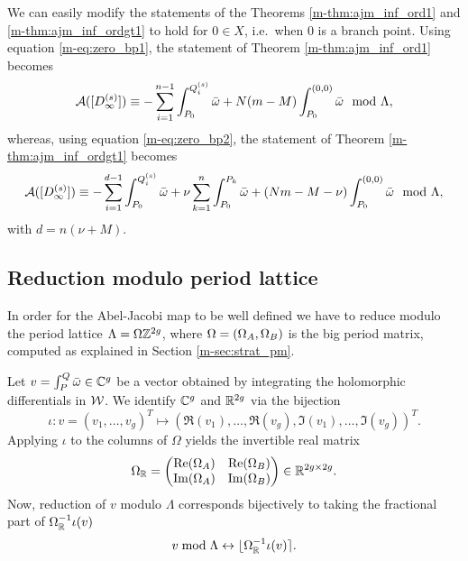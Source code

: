 \documentclass[main.tex]{subfiles}
\begin{document}
    \begin{rmk}\label{rmk:zero_bp}
     We can easily modify the statements of the Theorems \ref{m-thm:ajm_inf_ord1} and \ref{m-thm:ajm_inf_ordgt1} to hold for
     $0 \in X$, i.e.\ when $0$ is a branch point.
     Using equation \eqref{m-eq:zero_bp1}, the statement of Theorem \ref{m-thm:ajm_inf_ord1} becomes
      \begin{equation*}
       \mathcal{A}( [D_{\infty}^{(s)}] ) \equiv -\sum_{i = 1}^{n-1} \int_{P_0}^{Q_i^{(s)}} \bar{\omega} + N(m-M) \int_{P_0}^{(0,0)} \bar{\omega} \mod \Lambda,
    \end{equation*}
    whereas, using equation \eqref{m-eq:zero_bp2}, the statement of Theorem \ref{m-thm:ajm_inf_ordgt1} becomes
      \begin{equation*}
       \mathcal{A}( [D_{\infty}^{(s)}] ) \equiv -\sum_{i = 1}^{d-1} \int_{P_0}^{Q_i^{(s)}} \bar{\omega} + \nu \sum_{k=1}^n
      \int_{P_0}^{P_k} \bar{\omega} + (Nm-M-\nu) \int_{P_0}^{(0,0)} \bar{\omega} \mod \Lambda,
    \end{equation*}
    with $d = n(\nu+M)$.
    \end{rmk}

  \subsection{Reduction modulo period lattice}\label{subsec:lat_red}

    In order for the Abel-Jacobi map to be well defined we have to reduce modulo the period lattice $\Lambda =
  \Omega\mathbb{Z}^{2g}$, where $\Omega = (\Omega_A, \Omega_B)$ is the big period matrix, computed as explained in
  Section \ref{m-sec:strat_pm}.


   Let $v = \int_P^Q \bar{\omega} \in \mathbb{C}^g$ be a vector obtained by integrating the holomorphic differentials in
   $\mathcal{W}$.
   We identify $\mathbb{C}^g$ and $\mathbb{R}^{2g}$ via the bijection
   \begin{equation*}
    \iota: v = (v_1,\dots,v_g)^T \mapsto (\Re(v_1),\dots,\Re(v_g),\Im(v_1),\dots,\Im(v_g))^T.
   \end{equation*}
    Applying $\iota$ to the columns of $\Omega$ yields the invertible real matrix
   \begin{equation*}
    \Omega_{\mathbb{R}} =
   \begin{pmatrix}
     \operatorname{Re}(\Omega_A) & \operatorname{Re}(\Omega_B) \\
     \operatorname{Im}(\Omega_A) & \operatorname{Im}(\Omega_B)
    \end{pmatrix} \in \mathbb{R}^{2g \times 2g}.
   \end{equation*}
   Now, reduction of $v$ modulo $\Lambda$ corresponds bijectively to taking the fractional part of $\Omega_{\mathbb{R}}^{-1}\iota(v)$
   \begin{equation*}
    v \bmod \Lambda \leftrightarrow \lfloor \Omega_{\mathbb{R}}^{-1}\iota(v) \rceil.
   \end{equation*}


   \biblio
\end{document}
